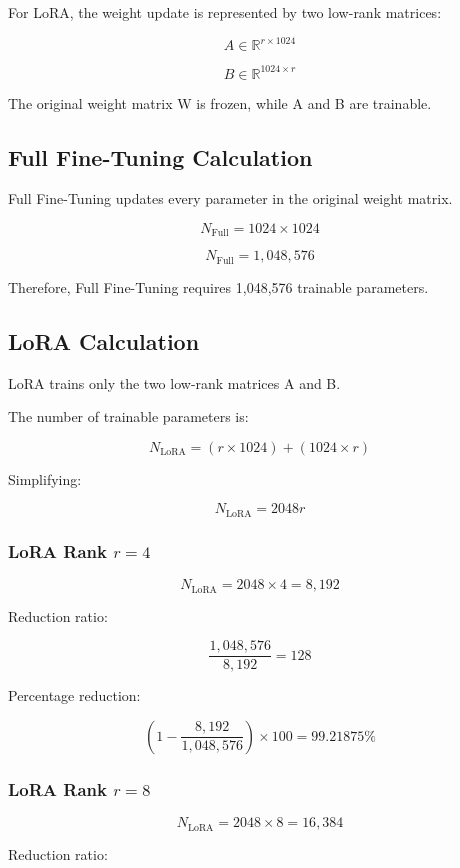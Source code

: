 For LoRA, the weight update is represented by two low-rank matrices:

\[
A \in \mathbb{R}^{r \times 1024}
\]

\[
B \in \mathbb{R}^{1024 \times r}
\]

The original weight matrix W is frozen, while A and B are trainable.

\subsection{Full Fine-Tuning Calculation}

Full Fine-Tuning updates every parameter in the original weight matrix.

\[
N_{\text{Full}} = 1024 \times 1024
\]

\[
\boxed{N_{\text{Full}} = 1,048,576}
\]

Therefore, Full Fine-Tuning requires 1,048,576 trainable parameters.

\subsection{LoRA Calculation}

LoRA trains only the two low-rank matrices A and B.

The number of trainable parameters is:

\[
N_{\text{LoRA}} = (r \times 1024) + (1024 \times r)
\]

Simplifying:

\[
\boxed{N_{\text{LoRA}} = 2048r}
\]

\subsubsection{LoRA Rank $r=4$}

\[
N_{\text{LoRA}} = 2048 \times 4 = 8,192
\]

Reduction ratio:

\[
\frac{1,048,576}{8,192} = 128
\]

Percentage reduction:

\[
\left(1-\frac{8,192}{1,048,576}\right)\times100
=99.21875\%
\]

\subsubsection{LoRA Rank $r=8$}

\[
N_{\text{LoRA}} = 2048 \times 8 = 16,384
\]

Reduction ratio:

